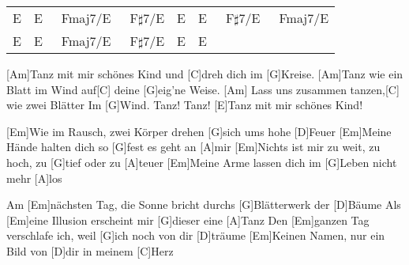 \begin{guitar}
	\begin{highlightbar}
		  
	\end{highlightbar}
	
	\songsection{Instrumental}
	{\footnotesize\begin{tabular}{|l|l|l|l|}
			E & E~~~Fmaj7/E~~~F$\sharp$7/E & E & E~~~F$\sharp$7/E~~~Fmaj7/E \\
			E & E~~~Fmaj7/E~~~F$\sharp$7/E & E & E 
	\end{tabular}} \optionalChord{(x3)}
	
	\begin{highlightbar}
		 \optionalChord{(x2)}
		[Am]Tanz mit mir schönes Kind und [C]dreh dich im [G]Kreise.
		[Am]Tanz wie ein Blatt im Wind auf[C] deine [G]eig'ne Weise.
		[Am] Lass uns zusammen tanzen,[C] wie zwei Blätter
		Im [G]Wind. Tanz! Tanz! [E]Tanz mit mir schönes Kind!
	\end{highlightbar}
	
	 \optionalChord{(x2)}

	\songsection{Strophe 3}
	[Em]Wie im Rausch, zwei Körper drehen [G]sich ums hohe [D]Feuer 
	[Em]Meine Hände halten dich so [G]fest es geht an [A]mir
	[Em]Nichts ist mir zu weit, zu hoch, zu [G]tief oder zu [A]teuer
	[Em]Meine Arme lassen dich im [G]Leben nicht mehr [A]los
	
	Am [Em]nächsten Tag, die Sonne bricht durchs [G]Blätterwerk der [D]Bäume
	Als [Em]eine Illusion erscheint mir [G]dieser eine [A]Tanz
	Den [Em]ganzen Tag verschlafe ich, weil [G]ich noch von dir [D]träume
	[Em]Keinen Namen, nur ein Bild von [D]dir in meinem [C]Herz
	
	\begin{highlightbar}
		  \optionalChord{(x2)}
	\end{highlightbar}
	
	 
\end{guitar}